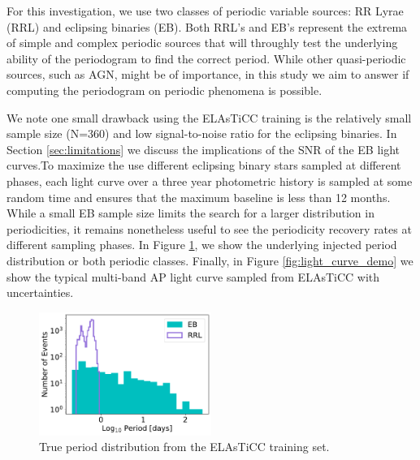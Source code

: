 \documentclass[DM,authoryear,toc]{lsstdoc}
\begin{document}
	
For this investigation, we use two classes of periodic variable sources: RR Lyrae (RRL) and eclipsing binaries (EB).
Both RRL's and EB's represent the extrema of simple and complex periodic sources that will throughly test the underlying ability of the periodogram to find the correct period.
While other quasi-periodic sources, such as AGN, might be of importance, in this study we aim to answer if computing the periodogram on periodic phenomena is possible.
 

We note one small drawback using the ELAsTiCC training is the relatively small sample size (N=360) and low signal-to-noise ratio for the eclipsing binaries.
In Section \ref{sec:limitations} we discuss the implications of the SNR of the EB light curves.To maximize the use different eclipsing binary stars sampled at different phases, each light curve over a three year photometric history is sampled at some random time and ensures that the maximum baseline is less than 12 months.
While a small EB sample size limits the search for a larger distribution in periodicities, it remains nonetheless useful to see the periodicity recovery rates at different sampling phases.
In Figure \ref{fig:period_distributions}, we show the underlying injected period distribution or both periodic classes.
Finally, in Figure \ref{fig:light_curve_demo} we show the typical multi-band AP light curve sampled from ELAsTiCC with uncertainties.

\begin{figure}
  \includegraphics[width=0.5\textwidth]{figures/period_distribution.pdf}
  \centering 
  \caption{True period distribution from the ELAsTiCC training set.}
   \label{fig:period_distributions}
\end{figure}
\end{document}
